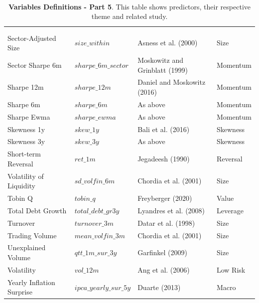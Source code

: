 \documentclass[preprint,12pt,authoryear]{elsarticle}
\begin{document}
\begin{appendices}
      \vspace{1em} %
\begin{table}[pt]
\captionsetup{
  justification=raggedright, %
  labelsep=none,
  singlelinecheck=false, %
  labelformat=boldlabel, %
}
\renewcommand{\arraystretch}{1.25}
\caption[Table 1: \footnotesize ]{\footnotesize \\ \textbf{Variables Definitions - Part 5}. This table shows predictors, their respective theme and related study.}  
\footnotesize %
\begin{tabularx}{\linewidth}{>{\raggedright\arraybackslash}m{3cm}>{\raggedright\arraybackslash}m{3.5cm}>{\raggedright\arraybackslash}m{4cm}>{\raggedright\arraybackslash}m{4cm}}
\hline
\multirow{2}{*}{Definition} & \multirow{2}{*}{Name} & \multirow{2}{*}{Citation} & \multirow{2}{*}{Cluster} \\
& & & \\
\hline

Sector-Adjusted Size & $size\_within$ & Asness et al. (2000) & Size \\
Sector Sharpe 6m & $sharpe\_6m\_sector$ & Moskowitz and Grinblatt (1999) & Momentum \\
Sharpe 12m & $sharpe\_12m$ & Daniel and Moskowitz (2016) & Momentum \\
Sharpe 6m & $sharpe\_6m$ & As above & Momentum \\
Sharpe Ewma & $sharpe\_ewma$ & As above & Momentum \\
Skewness 1y & $skew\_1y$ & Bali et al. (2016)  & Skewness \\
Skewness 3y & $skew\_3y$ & As above & Skewness \\
Short-term Reversal & $ret\_1m$ & Jegadeesh (1990) & Reversal \\
Volatility of Liquidity & $sd\_volfin\_6m$ & 
Chordia et al. (2001) & Size \\
Tobin Q & $tobin\_q$ & Freyberger (2020) & Value \\
Total Debt Growth & $total\_debt\_gr3y$ & Lyandres et al. (2008) & Leverage \\
Turnover & $turnover\_3m$ & Datar et al. (1998) & Size \\
Trading Volume & $mean\_volfin\_3m$ & Chordia et al. (2001) & Size \\
Unexplained Volume & $qtt\_1m\_sur\_3y$ & Garfinkel (2009) & Size \\
Volatility & $vol\_12m$ & Ang et al. (2006)  & Low Risk \\
Yearly Inflation Surprise & $ipca\_yearly\_sur\_5y$ & Duarte (2013) & Macro \\
\hline
\end{tabularx}
\label{mostcitedarticles}
\end{table}

\fi




\end{appendices}
\end{document}
